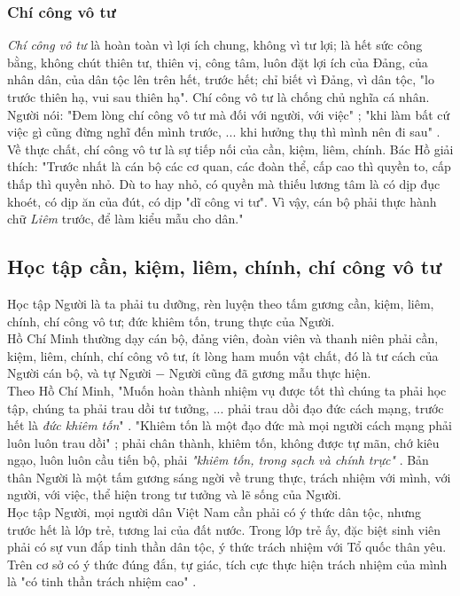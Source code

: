 \subsubsection{Chí công vô tư}
\textit{Chí công vô tư} là hoàn toàn vì lợi ích chung, không vì tư lợi; là hết sức công bằng, không chút thiên tư, thiên vị, công tâm, luôn đặt lợi ích của Đảng, của nhân dân, của dân tộc lên trên hết, trước hết; chỉ biết vì Đảng, vì dân tộc, "lo trước thiên hạ, vui sau thiên hạ". Chí công vô tư là chống chủ nghĩa cá nhân. Người nói: "Đem lòng chí công vô tư mà đối với người, với việc" \cite{HCMtt5}; "khi làm bất cứ việc gì cũng đừng nghĩ đến mình trước, ... khi hưởng thụ thì mình nên đi sau" \cite{HCMtt11}.\\
Về thực chất, chí công vô tư là sự tiếp nối của cần, kiệm, liêm, chính. Bác Hồ giải thích: "Trước nhất là cán bộ các cơ quan, các đoàn thể, cấp cao thì quyền to, cấp thấp thì quyền nhỏ. Dù to hay nhỏ, có quyền mà thiếu lương tâm là có dịp đục khoét, có dịp ăn của đút, có dịp "dĩ công vi tư". Vì vậy, cán bộ phải thực hành chữ \textit{Liêm} trước, để làm kiểu mẫu cho dân." \cite{HCMtt6}

\subsection{Học tập cần, kiệm, liêm, chính, chí công vô tư}
Học tập Người là ta phải tu dưỡng, rèn luyện theo tấm gương cần, kiệm, liêm, chính, chí công vô tư; đức khiêm tốn, trung thực của Người.\\
Hồ Chí Minh thường dạy cán bộ, đảng viên, đoàn viên và thanh niên phải cần, kiệm, liêm, chính, chí công vô tư, ít lòng ham muốn vật chất, đó là tư cách của Người cán bộ, và tự Người $-$ Người cũng đã gương mẫu thực hiện.\\
Theo Hồ Chí Minh, "Muốn hoàn thành nhiệm vụ được tốt thì chúng ta phải học tập, chúng ta phải trau dồi tư tưởng, ... phải trau dồi đạo đức cách mạng, trước hết là \textit{đức khiêm tốn}" \cite{HCMtt10}. "Khiêm tốn là một đạo đức mà mọi người cách mạng phải luôn luôn trau dồi" \cite{HCMtt8}; phải chân thành, khiêm tốn, không được tự mãn, chớ kiêu ngạo, luôn luôn cầu tiến bộ, phải \textit{"khiêm tốn, trong sạch và chính trực"} \cite{HCMtt7}. Bản thân Người là một tấm gương sáng ngời về trung thực, trách nhiệm với mình, với người, với việc, thể hiện trong tư tưởng và lẽ sống của Người.\\
Học tập Người, mọi người dân Việt Nam cần phải có ý thức dân tộc, nhưng trước hết là lớp trẻ, tương lai của đất nước. Trong lớp trẻ ấy, đặc biệt sinh viên phải có sự vun đắp tinh thần dân tộc, ý thức trách nhiệm với Tổ quốc thân yêu. Trên cơ sở có ý thức đúng đắn, tự giác, tích cực thực hiện trách nhiệm của mình là "có tinh thần trách nhiệm cao"
\cite{syllabus}.


